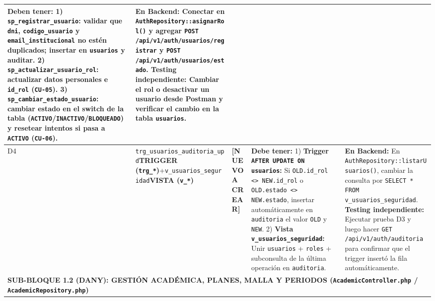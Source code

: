 \documentclass[10pt,a4paper,landscape]{article}
\newcommand{\stNuevo}{\textbf{\textcolor{red!75!black}{[NUEVO A CREAR]}}}
\newcommand{\objTrig}{\textbf{\textcolor{orange!80!black}{TRIGGER (\texttt{trg\_*})}}}
\newcommand{\objView}{\textbf{\textcolor{violet!85!black}{VISTA (\texttt{v\_*})}}}
\begin{document}
\begin{longtable}{|p{0.5cm}|p{3.8cm}|p{2.9cm}|p{8.8cm}|p{9.2cm}|}
\textbf{Deben tener:}
1) \texttt{sp\_registrar\_usuario}: validar que \texttt{dni}, \texttt{codigo\_usuario} y \texttt{email\_institucional} no estén duplicados; insertar en \texttt{usuarios} y auditar.
2) \texttt{sp\_actualizar\_usuario\_rol}: actualizar datos personales e \texttt{id\_rol} (\texttt{CU-05}).
3) \texttt{sp\_cambiar\_estado\_usuario}: cambiar estado en el switch de la tabla (\texttt{ACTIVO}/\texttt{INACTIVO}/\texttt{BLOQUEADO}) y resetear intentos si pasa a \texttt{ACTIVO} (\texttt{CU-06}). & 
\textbf{En Backend:} Conectar en \texttt{AuthRepository::asignarRol()} y agregar \texttt{POST /api/v1/auth/usuarios/registrar} y \texttt{POST /api/v1/auth/usuarios/estado}.\newline
\textbf{Testing independiente:} Cambiar el rol o desactivar un usuario desde Postman y verificar el cambio en la tabla \texttt{usuarios}. \\
\hline
\rowcolor{rowAlt}
D4 & \texttt{trg\_usuarios\_auditoria\_upd}\newline \objTrig\newline +\newline \texttt{v\_usuarios\_seguridad}\newline \objView & \stNuevo & 
\textbf{Debe tener:}
1) \textbf{Trigger \texttt{AFTER UPDATE ON usuarios}:} Si \texttt{OLD.id\_rol <> NEW.id\_rol} o \texttt{OLD.estado <> NEW.estado}, insertar automáticamente en \texttt{auditoria} el valor \texttt{OLD} y \texttt{NEW}.
2) \textbf{Vista \texttt{v\_usuarios\_seguridad}:} Unir \texttt{usuarios} + \texttt{roles} + subconsulta de la última operación en \texttt{auditoria}. & 
\textbf{En Backend:} En \texttt{AuthRepository::listarUsuarios()}, cambiar la consulta por \texttt{SELECT * FROM v\_usuarios\_seguridad}.\newline
\textbf{Testing independiente:} Ejecutar prueba D3 y luego hacer \texttt{GET /api/v1/auth/auditoria} para confirmar que el trigger insertó la fila automáticamente. \\
\hline

\multicolumn{5}{|l|}{\cellcolor{danyHeader}\textbf{\textcolor{unjbgNavy}{SUB-BLOQUE 1.2 (DANY): GESTIÓN ACADÉMICA, PLANES, MALLA Y PERIODOS (\texttt{AcademicController.php} / \texttt{AcademicRepository.php})}}} \\
\hline


\end{longtable}
\end{document}

